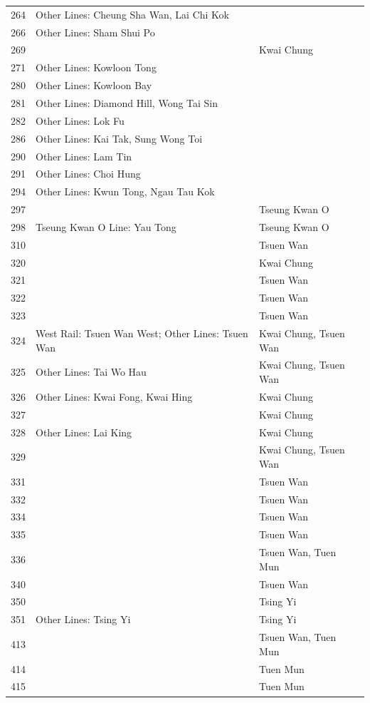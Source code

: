\begin{longtable}{p{1.5cm}p{8cm}p{4cm}}
264 & Other Lines: Cheung Sha Wan, Lai Chi Kok &  \\
266 & Other Lines: Sham Shui Po &  \\
269 &  & Kwai Chung \\
271 & Other Lines: Kowloon Tong &  \\
280 & Other Lines: Kowloon Bay &  \\
281 & Other Lines: Diamond Hill, Wong Tai Sin &  \\
282 & Other Lines: Lok Fu &  \\
286 & Other Lines: Kai Tak, Sung Wong Toi &  \\
290 & Other Lines: Lam Tin &  \\
291 & Other Lines: Choi Hung &  \\
294 & Other Lines: Kwun Tong, Ngau Tau Kok &  \\
297 &  & Tseung Kwan O \\
298 & Tseung Kwan O Line: Yau Tong & Tseung Kwan O \\
310 &  & Tsuen Wan \\
320 &  & Kwai Chung \\
321 &  & Tsuen Wan \\
322 &  & Tsuen Wan \\
323 &  & Tsuen Wan \\
324 & West Rail: Tsuen Wan West; Other Lines: Tsuen Wan & Kwai Chung, Tsuen Wan \\
325 & Other Lines: Tai Wo Hau & Kwai Chung, Tsuen Wan \\
326 & Other Lines: Kwai Fong, Kwai Hing & Kwai Chung \\
327 &  & Kwai Chung \\
328 & Other Lines: Lai King & Kwai Chung \\
329 &  & Kwai Chung, Tsuen Wan \\
331 &  & Tsuen Wan \\
332 &  & Tsuen Wan \\
334 &  & Tsuen Wan \\
335 &  & Tsuen Wan \\
336 &  & Tsuen Wan, Tuen Mun \\
340 &  & Tsuen Wan \\
350 &  & Tsing Yi \\
351 & Other Lines: Tsing Yi & Tsing Yi \\
413 &  & Tsuen Wan, Tuen Mun \\
414 &  & Tuen Mun \\
415 &  & Tuen Mun \\

\end{longtable}
